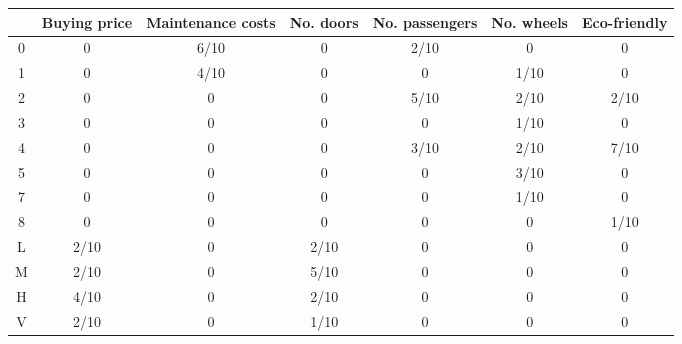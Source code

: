 \begin{tabular}{ccccccc}
\toprule
{} & Buying price & Maintenance costs & No. doors & No. passengers & No. wheels & Eco-friendly \\
\midrule
0 &            0 &              6/10 &         0 &           2/10 &          0 &            0 \\
1 &            0 &              4/10 &         0 &              0 &       1/10 &            0 \\
2 &            0 &                 0 &         0 &           5/10 &       2/10 &         2/10 \\
3 &            0 &                 0 &         0 &              0 &       1/10 &            0 \\
4 &            0 &                 0 &         0 &           3/10 &       2/10 &         7/10 \\
5 &            0 &                 0 &         0 &              0 &       3/10 &            0 \\
7 &            0 &                 0 &         0 &              0 &       1/10 &            0 \\
8 &            0 &                 0 &         0 &              0 &          0 &         1/10 \\
L &         2/10 &                 0 &      2/10 &              0 &          0 &            0 \\
M &         2/10 &                 0 &      5/10 &              0 &          0 &            0 \\
H &         4/10 &                 0 &      2/10 &              0 &          0 &            0 \\
V &         2/10 &                 0 &      1/10 &              0 &          0 &            0 \\
\bottomrule
\end{tabular}
